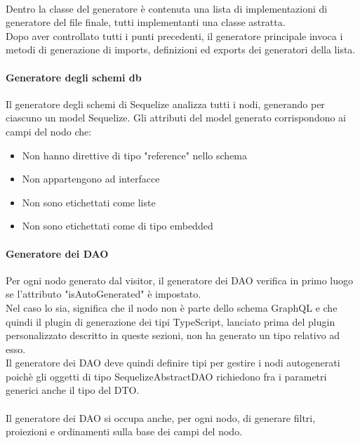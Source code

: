 \documentclass[a4paper, 12pt]{report}
\begin{document}
      \paragraph*{}
      Dentro la classe del generatore è contenuta una lista di implementazioni di generatore del file finale, tutti implementanti una classe astratta.\\
      Dopo aver controllato tutti i punti precedenti, il generatore principale invoca i metodi di generazione di imports, definizioni ed exports dei generatori della lista.
      \paragraph*{Generatore degli schemi db}
      Il generatore degli schemi di Sequelize analizza tutti i nodi, generando per ciascuno un model Sequelize.
      Gli attributi del model generato corrispondono ai campi del nodo che:
      \begin{itemize}
        \item Non hanno direttive di tipo "reference" nello schema
        \item Non appartengono ad interfacce
        \item Non sono etichettati come liste
        \item Non sono etichettati come di tipo embedded
      \end{itemize}
      \paragraph*{Generatore dei DAO}
      Per ogni nodo generato dal visitor, il generatore dei DAO verifica in primo luogo se l'attributo "isAutoGenerated" è impostato.\\
      Nel caso lo sia, significa che il nodo non è parte dello schema GraphQL e che quindi il plugin di generazione dei tipi TypeScript, lanciato prima del plugin personalizzato descritto in queste sezioni, non ha generato un tipo relativo ad esso.\\

      Il generatore dei DAO deve quindi definire tipi per gestire i nodi autogenerati poichè gli oggetti di tipo SequelizeAbstractDAO richiedono fra i parametri generici anche il tipo del DTO.
      \paragraph*{}
      Il generatore dei DAO si occupa anche, per ogni nodo, di generare filtri, proiezioni e ordinamenti sulla base dei campi del nodo.
\end{document}
